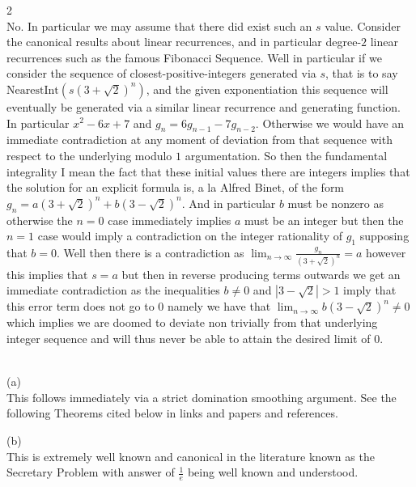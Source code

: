 2 \\
$\boxed{\text{No}}$. In particular we may assume that there did exist such an $s$ value. Consider the canonical results about linear recurrences, and in particular degree-$2$ linear recurrences such as the famous Fibonacci Sequence. Well in particular if we consider the sequence of closest-positive-integers generated via $s$, that is to say $\text{NearestInt}(s(3+\sqrt{2})^n)$, and the given exponentiation this sequence will eventually be generated via a similar linear recurrence and generating function. In particular $x^2-6x+7$ and $g_n = 6 g_{n-1} - 7 g_{n-2}$. Otherwise we would have an immediate contradiction at any moment of deviation from that sequence with respect to the underlying modulo $1$ argumentation. So then the fundamental integrality I mean the fact that these initial values there are integers implies that the solution for an explicit formula is, a la Alfred Binet, of the form $g_n = a(3+\sqrt{2})^n + b(3-\sqrt{2})^n$. And in particular $b$ must be nonzero as otherwise the $n=0$ case immediately implies $a$ must be an integer but then the $n=1$ case would imply a contradiction on the integer rationality of $g_1$ supposing that $b=0$. Well then there is a contradiction as $\lim_{n \to \infty} \frac{g_n}{(3+\sqrt{2})^n} = a$ however this implies that $s=a$ but then in reverse producing terms outwards we get an immediate contradiction as the inequalities $b \neq 0$ and $|3-\sqrt{2}| > 1$ imply that this error term does not go to $0$ namely we have that $\lim_{n \to \infty} b(3-\sqrt{2})^n \neq 0$ which implies we are doomed to deviate non trivially from that underlying integer sequence and will thus never be able to attain the desired limit of $0$.


 \\
(a) \\
This follows immediately via a strict domination smoothing argument. See the following Theorems cited below in links and papers and references.

(b) \\
This is extremely well known and canonical in the literature known as the Secretary Problem with answer of $\boxed{\frac{1}{e}}$ being well known and understood.

